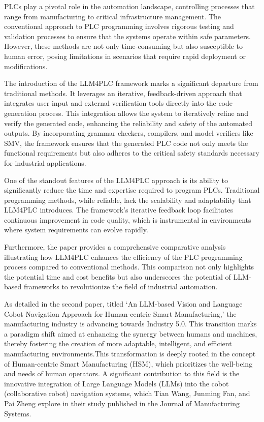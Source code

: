 \documentclass[journal,transmag]{IEEEtran}
\begin{document}
PLCs play a pivotal role in the automation landscape, controlling processes that range from manufacturing to critical infrastructure management. The conventional approach to PLC programming involves rigorous testing and validation processes to ensure that the systems operate within safe parameters. However, these methods are not only time-consuming but also susceptible to human error, posing limitations in scenarios that require rapid deployment or modifications.

The introduction of the LLM4PLC framework marks a significant departure from traditional methods. It leverages an iterative, feedback-driven approach that integrates user input and external verification tools directly into the code generation process. This integration allows the system to iteratively refine and verify the generated code, enhancing the reliability and safety of the automated outputs. By incorporating grammar checkers, compilers, and model verifiers like SMV, the framework ensures that the generated PLC code not only meets the functional requirements but also adheres to the critical safety standards necessary for industrial applications.

One of the standout features of the LLM4PLC approach is its ability to significantly reduce the time and expertise required to program PLCs. Traditional programming methods, while reliable, lack the scalability and adaptability that LLM4PLC introduces. The framework’s iterative feedback loop facilitates continuous improvement in code quality, which is instrumental in environments where system requirements can evolve rapidly.

Furthermore, the paper provides a comprehensive comparative analysis illustrating how LLM4PLC enhances the efficiency of the PLC programming process compared to conventional methods. This comparison not only highlights the potential time and cost benefits but also underscores the potential of LLM-based frameworks to revolutionize the field of industrial automation.


As detailed in the second paper, titled ‘An LLM-based Vision and Language Cobot Navigation Approach for Human-centric Smart Manufacturing,’\cite{wang2024llm} the manufacturing industry is advancing towards Industry 5.0. This transition marks a paradigm shift aimed at enhancing the synergy between humans and machines, thereby fostering the creation of more adaptable, intelligent, and efficient manufacturing environments.This transformation is deeply rooted in the concept of Human-centric Smart Manufacturing (HSM), which prioritizes the well-being and needs of human operators. A significant contribution to this field is the innovative integration of Large Language Models (LLMs) into the cobot (collaborative robot) navigation systems, which Tian Wang, Junming Fan, and Pai Zheng explore in their study published in the Journal of Manufacturing Systems.
\end{document}
